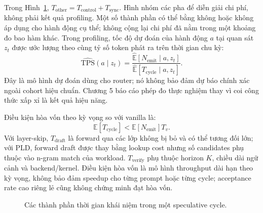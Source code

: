 Trong Hình~\ref{fig:cost-breakdown}, $T_{\mathrm{other}}=T_{\mathrm{control}}+T_{\mathrm{sync}}$. Hình nhóm các pha để diễn giải chi phí, không phải kết quả profiling.
Một số thành phần có thể bằng không hoặc không áp dụng cho hành động cụ thể; không cộng lại chi phí đã nằm trong một khoảng đo bao hàm khác. Trong profiling, tốc độ dự đoán của hành động $a$ tại quan sát $z_t$ được ước lượng theo cùng tỷ số token phát ra trên thời gian chu kỳ:
\begin{equation}
    \widehat{\mathrm{TPS}}(a\mid z_t)=
    \frac{\widehat{\mathbb{E}}[N_{\mathrm{emit}}\mid a,z_t]}
         {\widehat{\mathbb{E}}[T_{\mathrm{cycle}}\mid a,z_t]}.
    \label{eq:router-tps}
\end{equation}
Đây là mô hình dự đoán dùng cho router; nó không bảo đảm dự báo chính xác ngoài cohort hiệu chuẩn. Chương 5 báo cáo phép đo thực nghiệm thay vì coi công thức xấp xỉ là kết quả hiệu năng.

\begin{samepage}
Điều kiện hòa vốn theo kỳ vọng so với vanilla là:
\begin{equation}
    \mathbb{E}[T_{\mathrm{cycle}}]
    < \mathbb{E}[N_{\mathrm{emit}}]T_v.
\end{equation}
Với layer-skip, $T_{\mathrm{draft}}$ là forward qua các lớp không bị bỏ và có thể tương đối lớn; với PLD, forward draft được thay bằng lookup cost nhưng số candidates phụ thuộc vào n-gram match của workload. $T_{\mathrm{verify}}$ phụ thuộc horizon $K$, chiều dài ngữ cảnh và backend/kernel. Điều kiện hòa vốn là mô hình throughput dài hạn theo kỳ vọng, không bảo đảm speedup cho từng prompt hoặc từng cycle; acceptance rate cao riêng lẻ cũng không chứng minh đạt hòa vốn.
\end{samepage}

\begin{figure}[htbp]
\centering
{}
\caption{Các thành phần thời gian khái niệm trong một speculative cycle.}
\label{fig:cost-breakdown}
\end{figure}

